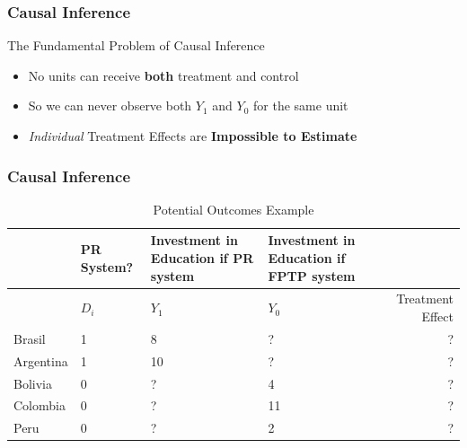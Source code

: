 \documentclass[xcolor=x11names,compress]{beamer}\usepackage[]{graphicx}\usepackage[]{color}
\renewcommand{\(}{\begin{columns}}
\renewcommand{\)}{\end{columns}}
\newcommand{\<}[1]{\begin{column}{#1}}
\renewcommand{\>}{\end{column}}
\begin{document}
\begin{frame}
\frametitle{Causal Inference}
\begin{block}{The Fundamental Problem of Causal Inference}
\begin{itemize}
\item No units can receive \textbf{both} treatment and control
\item So we can never observe both $Y_1$ and $Y_0$ for the same unit
\item \textit{Individual} Treatment Effects are \textbf{Impossible to Estimate}
\end{itemize}
\end{block}
\end{frame}

\begin{frame}
\frametitle{Causal Inference}
\footnotesize
\begin{table}[htbp]
  \centering
  \caption{Potential Outcomes Example}
    \begin{tabular}{|p{1.8cm}|p{2.2cm}|p{2.2cm}|p{1.8cm}|r|}
    \hline
          & \multicolumn{1}{p{1.8cm}|}{PR System?} & \multicolumn{1}{p{2.2cm}|}{Investment in Education if PR system} & \multicolumn{1}{p{2.2cm}|}{Investment in Education if FPTP system} &  \bigstrut\\
    \hline
          & \multicolumn{1}{p{1.8cm}|}{$D_i$} & \multicolumn{1}{p{2.2cm}|}{$Y_1$} & \multicolumn{1}{p{2.2cm}|}{$Y_0$} & \multicolumn{1}{p{1.8cm}|}{Treatment Effect} \bigstrut\\
    \hline
    Brasil & 1 & 8     & ?      & ? \bigstrut\\
    \hline
    Argentina & 1 & 10    & ?      & ? \bigstrut\\
    \hline
    Bolivia & 0 & ?     & 4     & ? \bigstrut\\
    \hline
    Colombia & 0 &  ?   & 11    & ? \bigstrut\\
    \hline
    Peru & 0 & ?     & 2     & ? \bigstrut\\
    \hline
    \end{tabular}%
  \label{tab:addlabel}%
\end{table}%
\normalsize
\end{frame}
\end{document}
